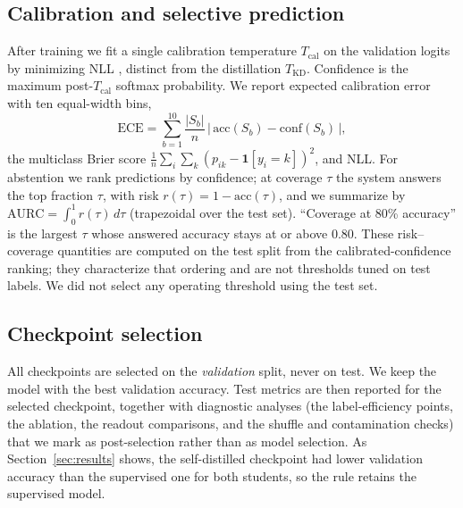 \documentclass[conference]{IEEEtran}
\begin{document}
\subsection{Calibration and selective prediction}
After training we fit a single calibration temperature $T_{\text{cal}}$ on the validation logits by minimizing NLL \cite{guocal}, distinct from the distillation $T_{\text{KD}}$. Confidence is the maximum post-$T_{\text{cal}}$ softmax probability. We report expected calibration error with ten equal-width bins,
\begin{equation}
\mathrm{ECE}=\sum_{b=1}^{10}\frac{|S_b|}{n}\,\bigl|\,\mathrm{acc}(S_b)-\mathrm{conf}(S_b)\,\bigr|,
\end{equation}
the multiclass Brier score $\frac{1}{n}\sum_i\sum_k (p_{ik}-\mathbf{1}[y_i=k])^2$, and NLL. For abstention we rank predictions by confidence; at coverage $\tau$ the system answers the top fraction $\tau$, with risk $r(\tau)=1-\mathrm{acc}(\tau)$, and we summarize by $\mathrm{AURC}=\int_0^1 r(\tau)\,d\tau$ (trapezoidal over the test set). ``Coverage at 80\% accuracy'' is the largest $\tau$ whose answered accuracy stays at or above $0.80$. These risk--coverage quantities are computed on the test split from the calibrated-confidence ranking; they characterize that ordering and are not thresholds tuned on test labels. We did not select any operating threshold using the test set.

\subsection{Checkpoint selection}
\label{sec:selection}
All checkpoints are selected on the \emph{validation} split, never on test. We keep the model with the best validation accuracy. Test metrics are then reported for the selected checkpoint, together with diagnostic analyses (the label-efficiency points, the ablation, the readout comparisons, and the shuffle and contamination checks) that we mark as post-selection rather than as model selection. As Section~\ref{sec:results} shows, the self-distilled checkpoint had lower validation accuracy than the supervised one for both students, so the rule retains the supervised model.
\end{document}
